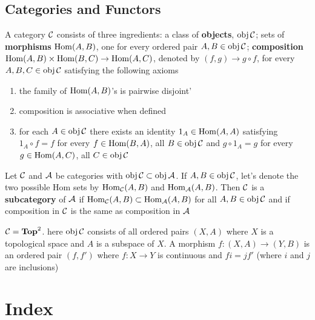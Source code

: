 \documentclass[11pt]{article}
\begin{document}
\subsection{Categories and Functors}
\label{sec:orgd1bedcb}
\begin{definition}[]
A category \(\mathcal{C}\) consists of three ingredients: a class of \textbf{objects}, \(\operatorname{obj}\mathcal{C}\); sets of
\textbf{morphisms} \(\operatorname{Hom}(A,B)\), one for every ordered pair \(A,B\in\operatorname{obj}\mathcal{C}\);
\textbf{composition} \(\operatorname{Hom}(A,B)\times\operatorname{Hom}(B,C)\to\operatorname{Hom}(A,C)\), denoted by \((f,g)\to g\circ f\), for
every \(A,B,C\in\operatorname{obj}\mathcal{C}\) satisfying the following axioms
\begin{enumerate}
\item the family of \(\operatorname{Hom}(A,B)\)'s is pairwise disjoint'
\item composition is associative when defined
\item for each \(A\in\operatorname{obj}\mathcal{C}\) there exists an identity \(1_A\in\operatorname{Hom}(A,A)\) satisfying \(1_A\circ f=f\) for
every \(f\in\operatorname{Hom}(B,A)\), all \(B\in\operatorname{obj}\mathcal{C}\) and \(g\circ 1_A=g\) for every \(g\in\operatorname{Hom}(A,C)\), all \(C\in\operatorname{obj}\mathcal{C}\)
\end{enumerate}
\end{definition}

\begin{definition}[]
Let \(\mathcal{C}\) and \(\mathcal{A}\) be categories with \(\operatorname{obj}\mathcal{C}\subset\operatorname{obj}\mathcal{A}\). If \(A,B\in\operatorname{obj}\mathcal{C}\), let's denote the two
possible Hom sets by \(\operatorname{Hom}_{\mathcal{C}}(A,B)\) and \(\operatorname{Hom}_{\mathcal{A}}(A,B)\). Then \(\mathcal{C}\) is a \textbf{subcategory}
of \(\mathcal{A}\) if \(\operatorname{Hom}_{\mathcal{C}}(A,B)\subset\operatorname{Hom}_{\mathcal{A}}(A,B)\) for all \(A,B\in\operatorname{obj}\mathcal{C}\) and if composition in \(\mathcal{C}\) is
the same as composition in \(\mathcal{A}\)
\end{definition}

\begin{examplle}[]
\(\mathcal{C}=\operatorname{\textbf{Top}}^{2}\). here \(\operatorname{obj}\mathcal{C}\) consists of all ordered pairs \((X,A)\) where \(X\) is a topological
space and \(A\) is a subspace of \(X\). A morphism \(f:(X,A)\to(Y,B)\) is an ordered
pair \((f,f')\) where \(f:X\to Y\) is continuous and \(fi=jf'\) (where \(i\) and \(j\) are
inclusions)
\begin{center}
\end{center}
\end{examplle}




\section{Index}
\label{sec:org0338f5c}
\renewcommand{\indexname}{}
\printindex
\end{document}
